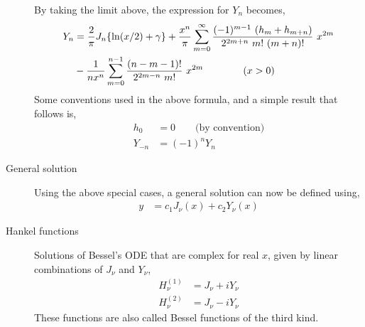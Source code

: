 \begin{description}
        By taking the limit above, the expression for $ Y_n $ becomes,
        \begin{align}
            Y_n & = \frac{2}{\pi} J_n \{ \ln(x/2) + \gamma \}
            + \frac{x^n}{\pi} \sum_{m = 0}^{\infty} \frac{(-1)^{m-1}\ (h_m + h_{m+n})}
            {2^{2m+n}\ m!\ (m+n)!}\ x^{2m}                          \\
                & - \frac{1}{nx^n} \sum_{m=0}^{n-1} \frac{(n-m-1)!}
            {2^{2m-n}\ m!}\ x^{2m}       \qquad\qquad (x>0)
        \end{align}
        Some conventions used in the above formula, and a simple result that follows
        is,
        \begin{align}
            h_0    & = 0 \qquad \text{(by convention)} \\
            Y_{-n} & = (-1)^n Y_n
        \end{align}

    \item[General solution] Using the above special cases, a general solution can now be
        defined using,
        \begin{align}
            y & = c_1 J_\nu(x) + c_2 Y_\nu (x)
        \end{align}

    \item[Hankel functions] Solutions of Bessel's ODE that are complex for real $ x $,
        given by linear combinations of $ J_\nu $ and $ Y_\nu $,
        \begin{align}
            H_\nu^{(1)} & = J_\nu + i Y_\nu \\
            H_\nu^{(2)} & = J_\nu - i Y_\nu
        \end{align}
        These functions are also called Bessel functions of the third kind.
\end{description}
